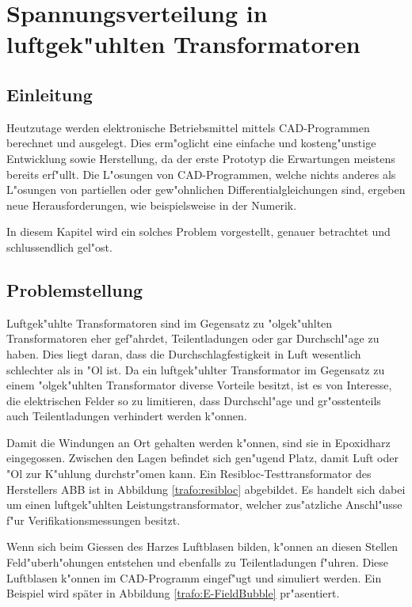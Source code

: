 \chapter{Spannungsverteilung in luftgek"uhlten Transformatoren\label{chapter:thema}}
\begin{refsection}

\section{Einleitung}

Heutzutage werden elektronische Betriebsmittel mittels CAD-Programmen berechnet und ausgelegt. Dies erm"oglicht eine einfache und kosteng"unstige Entwicklung sowie Herstellung, da der erste Prototyp die Erwartungen meistens bereits erf"ullt. Die L"osungen von CAD-Programmen, welche nichts anderes als L"osungen von partiellen oder gew"ohnlichen Differentialgleichungen sind, ergeben neue Herausforderungen, wie beispielsweise in der Numerik. 

In diesem Kapitel wird ein solches Problem vorgestellt, genauer betrachtet und schlussendlich gel"ost.

\section{Problemstellung}

Luftgek"uhlte Transformatoren sind im Gegensatz zu "olgek"uhlten Transformatoren eher gef"ahrdet, Teilentladungen oder gar Durchschl"age zu haben. Dies liegt daran, dass die Durchschlagfestigkeit in Luft wesentlich schlechter als in "Ol ist. Da ein luftgek"uhlter Transformator im Gegensatz zu einem "olgek"uhlten Transformator diverse Vorteile besitzt, ist es von Interesse, die elektrischen Felder so zu limitieren, dass Durchschl"age und gr"osstenteils auch Teilentladungen verhindert werden k"onnen. 

Damit die Windungen an Ort gehalten werden k"onnen, sind sie in Epoxidharz eingegossen. Zwischen den Lagen befindet sich gen"ugend Platz, damit Luft oder "Ol zur K"uhlung durchstr"omen kann. Ein Resibloc-Testtransformator des Herstellers ABB ist in Abbildung \ref{trafo:resibloc} abgebildet. Es handelt sich dabei um einen luftgek"uhlten Leistungstransformator, welcher zus"atzliche Anschl"usse f"ur Verifikationsmessungen besitzt. 

Wenn sich beim Giessen des Harzes Luftblasen bilden, k"onnen an diesen Stellen Feld"uberh"ohungen entstehen und ebenfalls zu Teilentladungen f"uhren. Diese Luftblasen k"onnen im CAD-Programm eingef"ugt und simuliert werden. Ein Beispiel wird später in Abbildung \ref{trafo:E-FieldBubble} pr"asentiert.


\end{refsection}
